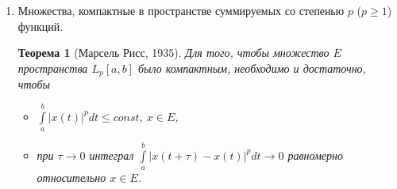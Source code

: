 \documentclass[12pt,a4paper,titlepage,oneside]{book}
\newcommand{\overbar}[1]{\mkern 1.5mu\overline{\mkern-1.5mu#1\mkern-1.5mu}\mkern 1.5mu}
\theoremstyle{definition}
\theoremstyle{plain}
\newtheorem*{theorem}{Теорема}
\theoremstyle{break}
\theoremstyle{remark}
\theoremstyle{remark}
\theoremstyle{remark}
\theoremstyle{remark}
\theoremstyle{plain}
\theoremstyle{plain}
\begin{document}
\begin{enumerate}
\begin{proof}
	Множество $H_{\varepsilon}$ компактно в $C[a, b]$. Действительно, каждая ломаная определяется $n$ числами $(\eta_1, \eta_2,\ldots,\eta_n )$, где все числа $\eta_k$ ограничены: $ \vert \eta_k \vert \leqslant const$. Из любой последовательности ломаных из $H_{\varepsilon}$ можно образовать фундаментальную подпоследовательность.
	
	Покажем, что компактное множество $H_{\varepsilon}$ образует в $E$ $\varepsilon$-сеть. Для любой функции $x\in E$ построим ломаную $\overbar{x}(t)$, $\overbar{x} \in H_{\varepsilon}$. Так как $x(t)$ непрерывна, то на отрезке $[t_k, t_{k+1}]$ она достигает своего максимального значения $M_k$ и своего минимального значения $m_k$: $m_k \leqslant x(t) \leqslant M_k$, $t \in [t_k, t_{k+1}]$. В этих же пределах лежат и значения линейной функции $\overbar{x}(t)$. Ясно, что $ \vert x(t)-\overbar{x}(t) \vert \leqslant M_k-m_k$, $t \in [t_k, t_{k+1}]$.
	
	В силу выбора значения $\delta$ величины $M_k-m_k < \varepsilon$. Тогда и $\rho(x, \overbar{x}) < \varepsilon$. Согласно следствию теоремы Хаусдорфа, множество $E$ компактно в $C[a, b]$.
	
	. Свойства функций из компактного множества $E$, указанные в теореме, сразу следуют из существования в $E$ $\underbar {конечной}$ $\varepsilon$-сети непрерывных на $[a, b]$ функций $x_1(t), x_2(t),\ldots,x_N(t)$.
\end{proof}

	\item Множества, компактные в пространстве суммируемых со степенью $p$ ($p \geqslant 1$) функций.

\begin{theorem}[Марсель Рисс, 1935]
Для того, чтобы множество $E$  пространства $L_p[a, b]$ было компактным, необходимо и достаточно, чтобы

\begin{itemize}

	\item $\displaystyle\int\limits_a^b \big \lvert x(t) \big \rvert^p dt \leqslant const$, $x \in E$,

	\item при $\tau \to 0$ интеграл $\displaystyle\int\limits_a^b \big \lvert x(t+\tau)-x(t) \big \rvert^p dt \to 0$ равномерно относительно $x \in E$.

\end{itemize}

\end{theorem}


\end{enumerate}
\end{document}
